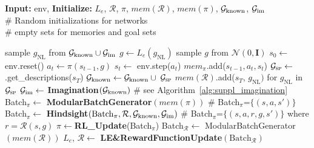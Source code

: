  \begin{algorithm}[h!]
    \caption{\imagine}
    \label{alg:example}

    \begin{algorithmic}[1]
       \STATE \textbf{Input:} env, \SP \hspace{1.cm}%
       \STATE \textbf{Initialize:} $L_e$, $\mathcal{R}$, $\pi$, $mem(\mathcal{R})$, $mem(\pi)$, $\mathcal{G}_\text{known}$, $\mathcal{G}_\text{im}$ \\  \hspace{1cm} \# Random initializations for networks  \\
       \hspace{1cm} \# empty sets for memories and goal sets
       
            \STATE sample $g_\text{NL}$ from $\mathcal{G}_\text{known} \cup \mathcal{G}_\text{im}$ 
            \STATE $g \gets L_e(g_\text{NL})$
         \ELSE
            \STATE sample $g$ from $\mathcal{N}(0,\mathbf{I})$
         \ENDIF
         \STATE $s_0 \gets$ env.reset()
            \STATE $a_t\gets\pi(s_{t-1},g)$
            \STATE $s_{t}\gets$ env.step($a_t$)
            \STATE $mem_{\pi}$.add($s_{t-1}, a_t, s_t$)
         \ENDFOR
         \STATE $\mathcal{G}_\text{\textsc{sp}} \gets$ \SP.get\_descriptions($s_T$)
         \STATE $\mathcal{G}_\text{known} \gets \mathcal{G}_\text{known} \: \cup$ $\mathcal{G}_\text{\textsc{sp}}$
         \STATE $mem(\mathcal{R})$.add($s_T$, $g_\text{NL})$ for $g_\text{NL}$ in $\mathcal{G}_\text{\textsc{sp}}$
            \STATE $\mathcal{G}_\text{im} \gets$ \textbf{Imagination}$(\mathcal{G}_\text{known})$ \# see Algorithm~\ref{alg:suppl_imagination}
         \ENDIF
         \STATE Batch$_{\pi} \gets$ \textbf{ModularBatchGenerator}$(mem(\pi))$ 
         \hspace{1cm} \# Batch$_{\pi}$=$\{(s,a,s')\}$
         \STATE Batch$_{\pi} \gets$ \textbf{Hindsight}$(\text{Batch}_\pi, \mathcal{R}, \mathcal{G}_\text{known}, \mathcal{G}_\text{im})$ 
         \hspace{0.2cm} \# Batch$_{\pi}$=$\{(s,a,r,g,s')\}$ where $r=\mathcal{R}(s,g)$
         \STATE $\pi \gets $\textbf{RL\_Update}(Batch$_{\pi}$)
      \STATE Batch$_{\mathcal{R}} \gets$ ModularBatchGenerator$(mem(\mathcal{R}))$
      \STATE $L_e$, $\mathcal{R} \gets$ \textbf{LE\&RewardFunctionUpdate}$(\text{Batch}_{\mathcal{R}})$
      \ENDIF
      \ENDFOR 
    \end{algorithmic}
\end{algorithm}  



